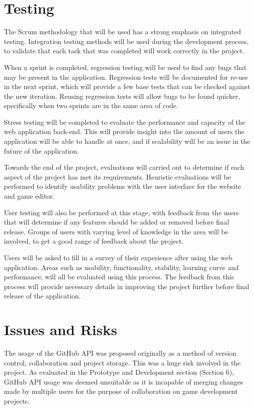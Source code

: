 \documentclass[a4paper, 12pt]{article}
\begin{document}
\section{Testing}
The Scrum methodology that will be used has a strong emphasis on integrated testing. Integration testing methods will be used during the development process, to validate that each task that was completed will work correctly in the project.

When a sprint is completed, regression testing will be used to find any bugs that may be present in the application. Regression tests will be documented for re-use in the next sprint, which will provide a few base tests that can be checked against the new iteration. Reusing regression tests will allow bugs to be found quicker, specifically when two sprints are in the same area of code.


Stress testing will be completed to evaluate the performance and capacity of the web application back-end. This will provide insight into the amount of users the application will be able to handle at once, and if scalability will be an issue in the future of the application.

Towards the end of the project, evaluations will carried out to determine if each aspect of the project has met its requirements. Heuristic evaluations will be performed to identify usability problems with the user interface for the website and game editor.

User testing will also be performed at this stage, with feedback from the users that will determine if any features should be added or removed before final release. Groups of users with varying level of knowledge in the area will be involved, to get a good range of feedback about the project.

Users will be asked to fill in a survey of their experience after using the web application. Areas such as usability, functionality, stability, learning curve and performance, will all be evaluated using this process. The feedback from this process will provide necessary details in improving the project further before final release of the application.

\section{Issues and Risks}
The usage of the GitHub API was proposed originally as a method of version control, collaboration and project storage. This was a huge risk involved in the project. As evaluated in the Prototype and Development section (Section 6), GitHub API usage was deemed unsuitable as it is incapable of merging changes made by multiple users for the purpose of collaboration on game development projects.
\end{document}
